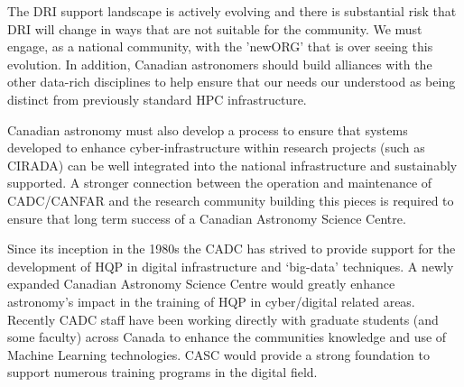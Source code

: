 \documentclass[11pt]{article}
\begin{document}
\begin{lrptextbox} 
The DRI support landscape is actively evolving and there is substantial risk that DRI will change in ways that are not suitable for the community.  We must engage, as a national community, with the 'newORG' that is over seeing this evolution.  In addition, Canadian astronomers should build alliances with the other data-rich disciplines to help ensure that our needs our understood as being distinct from previously standard HPC infrastructure.  

Canadian astronomy must also develop a process to ensure that systems developed to enhance cyber-infrastructure within research projects (such as CIRADA) can be well integrated into the national infrastructure and sustainably supported.  A stronger connection between the operation and maintenance of CADC/CANFAR and the research community building this pieces is required to ensure that long term success of a Canadian Astronomy Science Centre.

\end{lrptextbox}

\begin{lrptextbox} 
Since its inception in the 1980s the CADC has strived to provide support for the development of HQP in digital infrastructure and `big-data' techniques.  A newly expanded Canadian Astronomy Science Centre would greatly enhance astronomy's impact in the training of HQP in cyber/digital  related areas.  Recently CADC staff have been working directly with graduate students (and some faculty) across Canada to enhance the communities knowledge and use of Machine Learning technologies.  CASC would provide a strong foundation to support numerous training programs in the digital field.
\end{lrptextbox}

 
\end{document}
